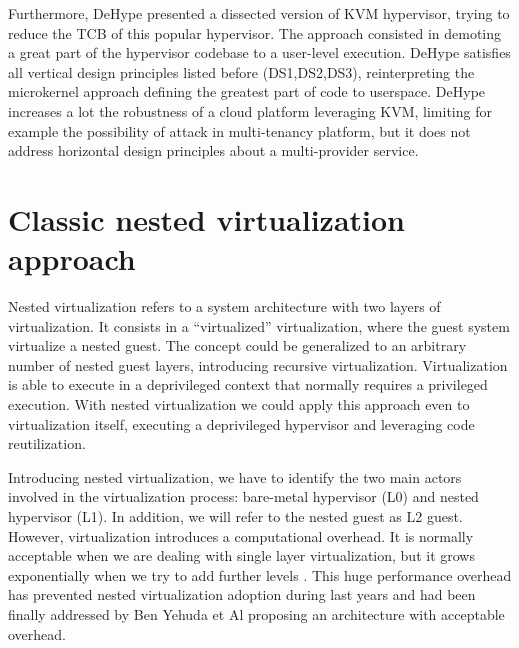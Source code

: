 \documentclass{sig-alternate}
\begin{document}
Furthermore, DeHype \cite{wu2013TamHosHypMosDepExe} presented a dissected version of KVM hypervisor, trying to reduce the TCB of this popular hypervisor. The approach consisted in demoting a great part of the hypervisor codebase to a user-level execution. DeHype satisfies all vertical design principles listed before (DS1,DS2,DS3), reinterpreting the microkernel approach defining  the greatest part of code to userspace. DeHype increases a lot the robustness of a cloud platform leveraging KVM, limiting for example the possibility of attack in multi-tenancy platform, but it does not address horizontal design principles about a multi-provider service.

\section{Classic nested virtualization approach}
\label{sec:classic}

Nested virtualization refers to a system architecture with two layers of virtualization. It consists in a ``virtualized'' virtualization, where the guest system virtualize a nested guest. The concept could be generalized to an arbitrary number of nested guest layers, introducing recursive virtualization. Virtualization is able to execute in a deprivileged context  that normally requires a privileged execution. With nested virtualization we could apply this approach even to virtualization itself, executing a deprivileged hypervisor and leveraging code reutilization.

Introducing nested virtualization, we have to identify the two main actors involved in the virtualization process: bare-metal hypervisor (L0) and nested hypervisor (L1). In addition, we will refer to the nested guest as L2 guest. 
However, virtualization introduces a computational overhead. It is normally acceptable when we are dealing with single layer virtualization, but it grows exponentially when we try to add further levels \cite{rec:virt}. This huge performance overhead has prevented nested virtualization adoption during last years and had been finally addressed by Ben Yehuda et Al \cite{turtles:ibm} proposing an architecture with acceptable overhead.
\end{document}
